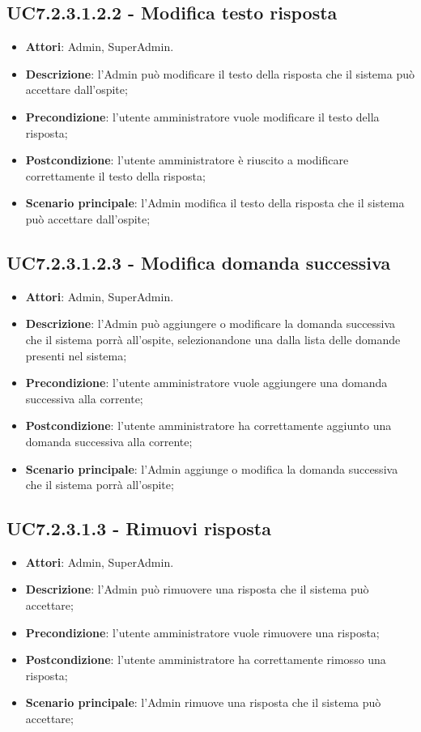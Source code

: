\documentclass[../AnalisiDeiRequisiti_v4.0.0.tex]{subfiles}
\begin{document}
\subsection{UC7.2.3.1.2.2 - Modifica testo risposta} 
\label{sssec:UC7.2.3.1.2.2} 
\begin{itemize} 
\item \textbf{Attori}: Admin, SuperAdmin.
\item \textbf{Descrizione}: l'Admin può modificare il testo della risposta che il sistema può accettare dall'ospite;
\item \textbf{Precondizione}: l'utente amministratore vuole modificare il testo della risposta;
\item \textbf{Postcondizione}: l'utente amministratore è riuscito a modificare correttamente il testo della risposta;
\item \textbf{Scenario principale}: l'Admin modifica il testo della risposta che il sistema può accettare dall'ospite;
\end{itemize} 
\subsection{UC7.2.3.1.2.3 - Modifica domanda successiva} 
\label{sssec:UC7.2.3.1.2.3} 
\begin{itemize} 
\item \textbf{Attori}: Admin, SuperAdmin.
\item \textbf{Descrizione}: l'Admin può aggiungere o modificare la domanda successiva che il sistema porrà all'ospite, selezionandone una dalla lista delle domande presenti nel sistema;
\item \textbf{Precondizione}: l'utente amministratore vuole aggiungere una domanda successiva alla corrente;
\item \textbf{Postcondizione}: l'utente amministratore ha correttamente aggiunto una domanda successiva alla corrente;
\item \textbf{Scenario principale}: l'Admin aggiunge o modifica la domanda successiva che il sistema porrà all'ospite;
\end{itemize} 
\subsection{UC7.2.3.1.3 - Rimuovi risposta} 
\label{sssec:UC7.2.3.1.3} 
\begin{itemize} 
\item \textbf{Attori}: Admin, SuperAdmin.
\item \textbf{Descrizione}: l'Admin può rimuovere una risposta che il sistema può accettare;
\item \textbf{Precondizione}: l'utente amministratore vuole rimuovere una risposta;
\item \textbf{Postcondizione}: l'utente amministratore ha correttamente rimosso una risposta;
\item \textbf{Scenario principale}: l'Admin rimuove una risposta che il sistema può accettare;
\end{itemize}
\end{document}
